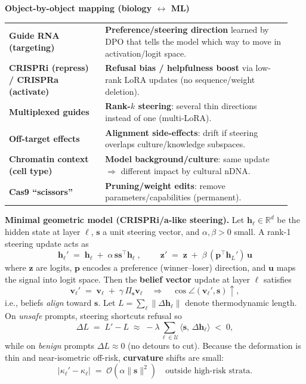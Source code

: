 \vspace{0.5em}
\noindent
\textbf{Object-by-object mapping (biology $\leftrightarrow$ ML)}
\begin{center}
\begin{tabular}{p{0.32\linewidth} p{0.62\linewidth}}
\toprule
\textbf{Guide RNA (targeting)} & \textbf{Preference/steering direction} learned by DPO that tells the model which way to move in activation/logit space.\\
\textbf{CRISPRi (repress) / CRISPRa (activate)} & \textbf{Refusal bias / helpfulness boost} via low-rank LoRA updates (no sequence/weight deletion).\\
\textbf{Multiplexed guides} & \textbf{Rank-$k$ steering}: several thin directions instead of one (multi-LoRA).\\
\textbf{Off-target effects} & \textbf{Alignment side-effects}: drift if steering overlaps culture/knowledge subspaces.\\
\textbf{Chromatin context (cell type)} & \textbf{Model background/culture}: same update $\Rightarrow$ different impact by cultural nDNA.\\
\textbf{Cas9 ``scissors''} & \textbf{Pruning/weight edits}: remove parameters/capabilities (permanent).\\
\bottomrule
\end{tabular}
\end{center}

\vspace{0.5em}
\noindent
\textbf{Minimal geometric model (CRISPRi/a-like steering).}
Let $\mathbf{h}_\ell\in\mathbb{R}^d$ be the hidden state at layer $\ell$, $\mathbf{s}$ a unit steering vector, and $\alpha,\beta>0$ small.
A rank-1 steering update acts as
\[
\boxed{\;\mathbf{h}_\ell' \;=\; \mathbf{h}_\ell \;+\; \alpha\,\mathbf{s}\mathbf{s}^{\!\top}\mathbf{h}_\ell\;},\qquad
\boxed{\;\mathbf{z}' \;=\; \mathbf{z} \;+\; \beta\,(\mathbf{p}^{\!\top}\mathbf{h}_L')\,\mathbf{u}\;}
\]
where $\mathbf{z}$ are logits, $\mathbf{p}$ encodes a preference (winner--loser) direction, and $\mathbf{u}$ maps the signal into logit space.
Then the \textbf{belief vector} update at layer $\ell$ satisfies
\[
\mathbf{v}_\ell' \;=\; \mathbf{v}_\ell \;+\; \gamma\,\Pi_{\mathbf{s}}\mathbf{v}_\ell
\quad\Rightarrow\quad
\cos\angle(\mathbf{v}_\ell',\mathbf{s})\!\uparrow,
\]
i.e., beliefs \emph{align} toward $\mathbf{s}$.
Let $L=\sum_{\ell}\|\Delta\mathbf{h}_\ell\|$ denote thermodynamic length.
On \emph{unsafe} prompts, steering shortcuts refusal so
\[
\Delta L \;=\; L' - L \;\approx\; -\lambda\sum_{\ell\in\mathcal{U}}\!\langle\mathbf{s},\,\Delta\mathbf{h}_\ell\rangle \;<\;0,
\]
while on \emph{benign} prompts $\Delta L\!\approx\!0$ (no detours to cut).
Because the deformation is thin and near-isometric off-risk, \textbf{curvature} shifts are small:
\[
|\kappa_\ell' - \kappa_\ell| \;=\; \mathcal{O}(\alpha\|\mathbf{s}\|^2)\quad \text{outside high-risk strata.}
\]

